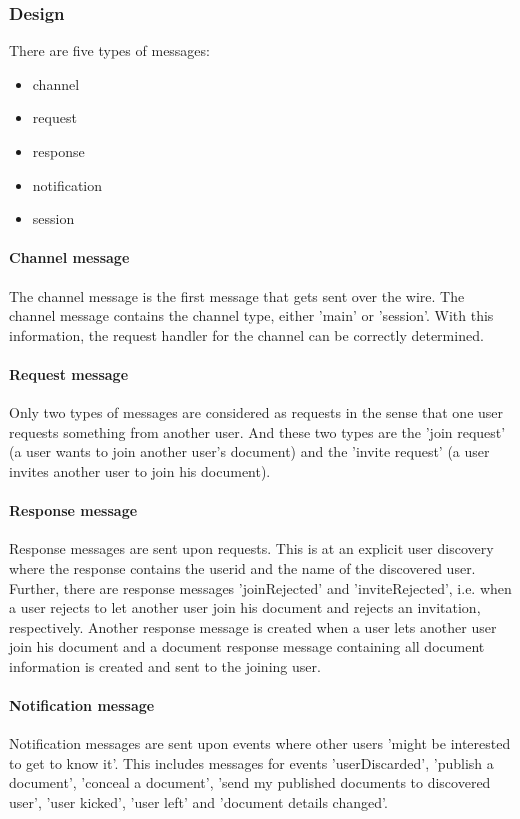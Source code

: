 \subsubsection{Design}
There are five types of messages:

\begin{itemize}
\item channel
\item request
\item response
\item notification
\item session
\end{itemize}

\paragraph{Channel message}
The channel message is the first message that gets sent over the wire. The channel message contains the channel type, either 'main' or 'session'. With this information, the request handler for the channel can be correctly determined.

\paragraph{Request message}
Only two types of messages are considered as requests in the sense that one user requests something from another user. And these two types are the 'join request' (a user wants to join another user's document) and the 'invite request' (a user invites another user to join his document).

\paragraph{Response message}
Response messages are sent upon requests. This is at an explicit user discovery where the response contains the userid and the name of the discovered user. Further, there are response messages 'joinRejected' and 'inviteRejected', i.e. when a user rejects to let another user join his document and rejects an invitation, respectively. Another response message is created when a user lets another user join his document and a document response message containing all document information is created and sent to the joining user.

\paragraph{Notification message}
Notification messages are sent upon events where other users 'might be interested to get to know it'. This includes messages for events 'userDiscarded', 'publish a document', 'conceal a document', 'send my published documents to discovered user', 'user kicked', 'user left' and 'document details changed'.

